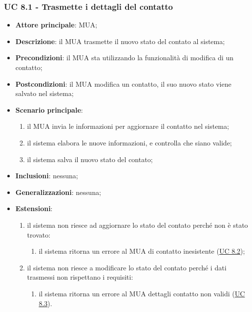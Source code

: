 \subsubsection{UC 8.1 - Trasmette i dettagli del contatto} \label{sec:UC8.1}
    \begin{itemize}
        \item \textbf{Attore principale}: MUA;
        \item \textbf{Descrizione}: il MUA trasmette il nuovo stato del contato al sistema;
        \item \textbf{Precondizioni}: il MUA sta utilizzando la funzionalità di modifica di un contatto;
        \item \textbf{Postcondizioni}: il MUA modifica un contatto, il suo nuovo stato viene salvato nel sistema;
        \item \textbf{Scenario principale}:
            \begin{enumerate}
                \item il MUA invia le informazioni per aggiornare il contatto nel sistema;
                \item il sistema elabora le nuove informazioni, e controlla che siano valide;
                \item il sistema salva il nuovo stato del contato;
            \end{enumerate}
        \item \textbf{Inclusioni}: nessuna;
        \item \textbf{Generalizzazioni}: nessuna;
        \item \textbf{Estensioni}: 
            \begin{enumerate}[label=\alph*.]
                \item il sistema non riesce ad aggiornare lo stato del contato perché non è stato trovato:
                \begin{enumerate}[label=\arabic*.]
                    \item il sistema ritorna un errore al MUA di contatto inesistente (\hyperref[sec:UC8.2]{UC 8.2});
                \end{enumerate}
                \item il sistema non riesce a modificare lo stato del contato perché i dati trasmessi non rispettano i requisiti:
                \begin{enumerate}[label=\arabic*.]
                    \item il sistema ritorna un errore al MUA dettagli contatto non validi (\hyperref[sec:U8.3]{UC 8.3}).
                \end{enumerate}
            \end{enumerate}
    \end{itemize}

